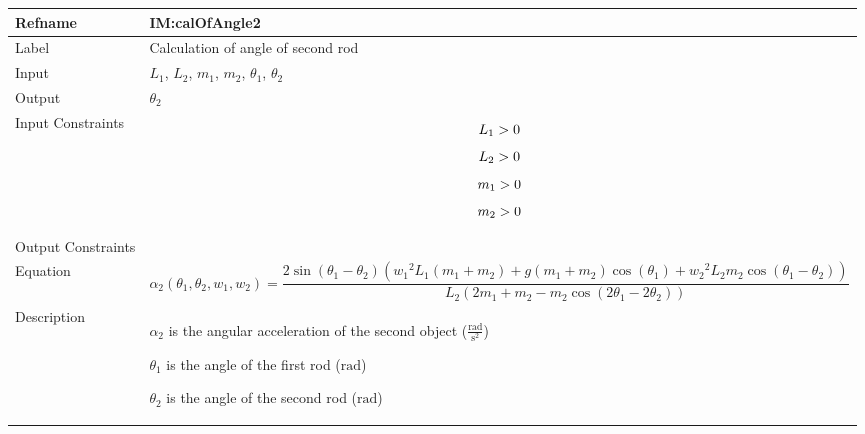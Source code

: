 \documentclass[12pt]{article}
\newcommand{\gt}{\ensuremath >}
\begin{document}
\begin{minipage}{\textwidth}
\begin{tabular}{>{\raggedright}p{}>{\raggedright\arraybackslash}p{}}
\toprule \textbf{Refname} & \textbf{IM:calOfAngle2}
\label{IM:calOfAngle2}
\\ \midrule
Label & Calculation of angle of second rod
        
\\ \midrule
Input & ${L_{1}}$, ${L_{2}}$, ${m_{1}}$, ${m_{2}}$, ${θ_{1}}$, ${θ_{2}}$
        
\\ \midrule
Output & ${θ_{2}}$
         
\\ \midrule
Input Constraints & \begin{displaymath}
                    {L_{1}}\gt{}0
                    \end{displaymath}
                    \begin{displaymath}
                    {L_{2}}\gt{}0
                    \end{displaymath}
                    \begin{displaymath}
                    {m_{1}}\gt{}0
                    \end{displaymath}
                    \begin{displaymath}
                    {m_{2}}\gt{}0
                    \end{displaymath}
\\ \midrule
Output Constraints & 
\\ \midrule
Equation & \begin{displaymath}
           {α_{2}}\left({θ_{1}},{θ_{2}},{w_{1}},{w_{2}}\right)=\frac{2 \sin\left({θ_{1}}-{θ_{2}}\right) \left({w_{1}}^{2} {L_{1}} \left({m_{1}}+{m_{2}}\right)+g \left({m_{1}}+{m_{2}}\right) \cos\left({θ_{1}}\right)+{w_{2}}^{2} {L_{2}} {m_{2}} \cos\left({θ_{1}}-{θ_{2}}\right)\right)}{{L_{2}} \left(2 {m_{1}}+{m_{2}}-{m_{2}} \cos\left(2 {θ_{1}}-2 {θ_{2}}\right)\right)}
           \end{displaymath}
\\ \midrule
Description & \begin{symbDescription}
              \item{${α_{2}}$ is the angular acceleration of the second object ($\frac{\text{rad}}{\text{s}^{2}}$)}
              \item{${θ_{1}}$ is the angle of the first rod (${\text{rad}}$)}
              \item{${θ_{2}}$ is the angle of the second rod (${\text{rad}}$)}

\end{symbDescription}
\end{tabular}
\end{minipage}
\end{document}
